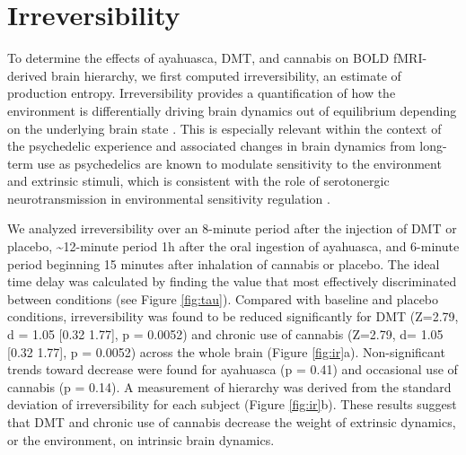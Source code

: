 \section{Irreversibility}
To determine the effects of ayahuasca, DMT, and
cannabis on BOLD fMRI-derived brain hierarchy, 
we first computed irreversibility, an estimate of
production entropy. Irreversibility provides a quantification of how the environment is differentially
driving brain dynamics out of equilibrium depending on the underlying
brain state \parencite{Deco2022,Kringelbach2023}. This is especially relevant within the
context of the psychedelic experience and associated changes in brain
dynamics from long-term use as psychedelics are known to modulate
sensitivity to the environment and extrinsic stimuli, which is
consistent with the role of serotonergic neurotransmission in
environmental sensitivity regulation \parencite{Branchi2011,Carhart-Harris2017}.

We analyzed irreversibility over an 8-minute period after the injection
of DMT or placebo, \textasciitilde12-minute period 1h after the oral
ingestion of ayahuasca, and 6-minute period beginning 15 minutes after
inhalation of cannabis or placebo. The ideal time delay was calculated by finding the value that most effectively discriminated between conditions (see Figure \ref{fig:tau}). Compared
with baseline and placebo conditions, irreversibility was found to be
reduced significantly for DMT (Z=2.79, d = 1.05 [0.32 1.77], p = 0.0052)  and chronic use of
cannabis (Z=2.79, d= 1.05 [0.32 1.77], p = 0.0052) across the whole brain (Figure \ref{fig:ir}a).
Non-significant trends toward decrease were found for ayahuasca (p = 0.41) and
occasional use of cannabis (p = 0.14). A measurement of hierarchy was derived from
the standard deviation of irreversibility for each subject (Figure \ref{fig:ir}b). These results suggest that DMT and chronic
use of cannabis decrease the weight of extrinsic dynamics, or the
environment, on intrinsic brain dynamics.


